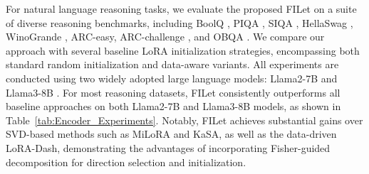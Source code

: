 \documentclass{article}
\theoremstyle{plain}
\theoremstyle{definition}
\theoremstyle{remark}
\begin{document}



For natural language reasoning tasks, we evaluate the proposed FILet on a suite of diverse reasoning benchmarks, including BoolQ \cite{BOOLQ}, PIQA \cite{PIQA}, SIQA \cite{SIQA}, HellaSwag \cite{HELLASWAG}, WinoGrande \cite{WINOGRANDE}, ARC-easy, ARC-challenge \cite{ARC}, and OBQA \cite{OBQA}. We compare our approach with several baseline LoRA initialization strategies, encompassing both standard random initialization and data-aware variants. All experiments are conducted using two widely adopted large language models: Llama2-7B \cite{LLAMA2} and Llama3-8B \cite{LLAMA3}. For most reasoning datasets, FILet consistently outperforms all baseline approaches on both Llama2-7B and Llama3-8B models, as shown in Table~\ref{tab:Encoder_Experiments}. Notably, FILet achieves substantial gains over SVD-based methods such as MiLoRA and KaSA, as well as the data-driven LoRA-Dash, demonstrating the advantages of incorporating Fisher-guided decomposition for direction selection and initialization.


\end{document}
